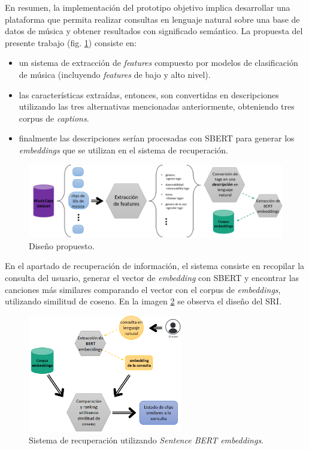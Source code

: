 En resumen, la implementación del prototipo objetivo implica desarrollar una plataforma que permita realizar consultas en lenguaje natural sobre una base de datos de música y obtener resultados con significado semántico. La propuesta del presente trabajo (fig. \ref{fig:corpus_embeddings}) consiste en:
\begin{itemize}
    \item un sistema de extracción de \textit{features} compuesto por modelos de clasificación de música (incluyendo \textit{features} de bajo y alto nivel).
    \item las características extraídas, entonces, son convertidas en descripciones utilizando las tres alternativas mencionadas anteriormente, obteniendo tres corpus de \textit{captions}.
    \item finalmente las descripciones serían procesadas con SBERT para generar los \textit{embeddings} que se utilizan en el sistema de recuperación.
\end{itemize}
\begin{figure}[h]
	\centering
	\includegraphics[width=\textwidth]{Graphics/corpus_embeddings.png}
	\caption{Diseño propuesto.} 
    \label{fig:corpus_embeddings}
\end{figure}
En el apartado de recuperación de información, el sistema consiste en recopilar la consulta del usuario, generar el vector de \textit{embedding} con SBERT y encontrar las canciones más similares comparando el vector con el corpus de \textit{embeddings}, utilizando similitud de coseno. En la imagen \ref{fig:sri_design} se observa el diseño del SRI. 
\begin{figure}[h]
	\centering
	\includegraphics[width=0.6\textwidth]{Graphics/SRI.png}
	\caption{Sistema de recuperación utilizando \textit{Sentence BERT embeddings}.} 
    \label{fig:sri_design}
\end{figure}
